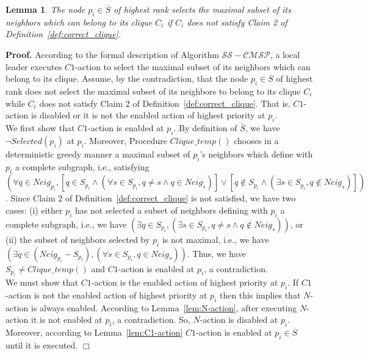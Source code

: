 \documentclass[11pt,letterpaper,onecolumn]{article}
\newtheorem{lemma}{Lemma}
\newenvironment{proof}{\noindent \begin{rm}{\textbf{Proof.} }}{\hspace*{\fill}$\Box$\par\end{rm} \vspace{.3cm}}
\begin{document}
\begin{lemma}
\label{lem:select_clique}
The node $p_i \in \overline{S}$ of highest rank selects the maximal subset of its neighbors which can belong to its clique $C_i$ if $C_i$ does not satisfy Claim 2 of Definition~\ref{def:correct_clique}.
\end{lemma}

\begin{proof}
According to the formal description of Algorithm $\mathcal{SS-CMSP}$, a local leader executes $C1$-action to select the maximal subset of its neighbors which can belong to its clique. Assume, by the contradiction, that the node $p_i \in \overline{S}$ of highest rank does not select the maximal subset of its neighbors to belong to its clique $C_i$ while $C_i$ does not satisfy Claim 2 of Definition~\ref{def:correct_clique}. That is, $C1$-action is disabled or it is not the enabled action of highest priority at $p_i$.\\
We first show that $C1$-action is enabled at $p_i$. By definition of $\overline{S}$, we have $\neg Selected(p_i)$ at $p_i$. Moreover, Procedure $Clique\_temp()$ chooses in a deterministic greedy manner a maximal subset of $p_i$'s neighbors which define with $p_i$ a complete subgraph, i.e., satisfying $(\forall q \in Neig_{p_i}, [q \in S_{p_i} \wedge (\forall s \in S_{p_i}, q \neq s \wedge q \in Neig_s)] \vee [q \not \in S_{p_i} \wedge (\exists s \in S_{p_i}, q \not \in Neig_s)])$. Since Claim 2 of Definition~\ref{def:correct_clique} is not satisfied, we have two cases: (i) either $p_i$ has not selected a subset of neighbors defining with $p_i$ a complete subgraph, i.e., we have $(\exists q \in S_{p_i}, (\exists s \in S_{p_i}, q \neq s \wedge q \not \in Neig_s))$, or (ii) the subset of neighbors selected by $p_i$ is not maximal, i.e., we have $(\exists q \in (Neig_{p_i}-S_{p_i}), (\forall s \in S_{p_i}, q \in Neig_s))$. Thus, we have $S_{p_i} \neq Clique\_temp()$ and $C1$-action is enabled at $p_i$, a contradiction.\\
We must show that $C1$-action is the enabled action of highest priority at $p_i$. If $C1$-action is not the enabled action of highest priority at $p_i$ then this implies that $N$-action is always enabled. According to Lemma~\ref{lem:N-action}, after executing $N$-action it is not enabled at $p_i$, a contradiction. So, $N$-action is disabled at $p_i$. Moreover, according to Lemma~\ref{lem:C1-action} $C1$-action is enabled at $p_i \in \overline{S}$ until it is executed.
\end{proof}
\end{document}

